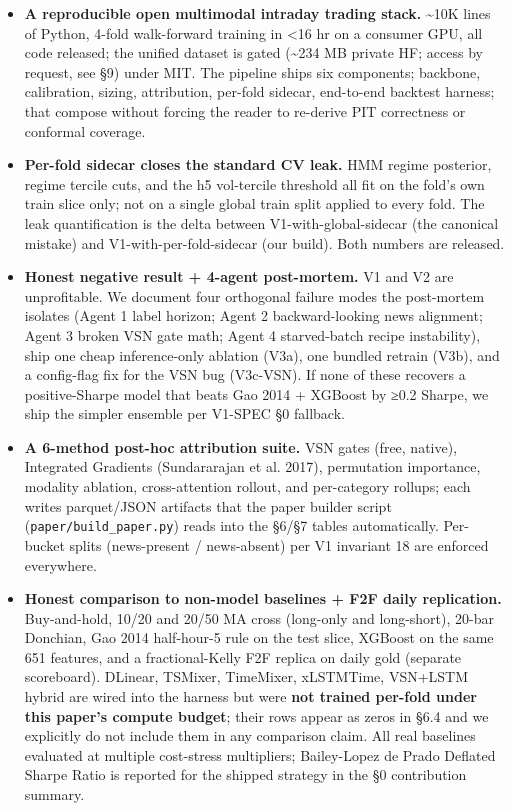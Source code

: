 \documentclass[
]{article}
\newcounter{none} %
\begin{document}
\begin{itemize}
\item
  \textbf{A reproducible open multimodal intraday trading stack.}
  \textasciitilde10K lines of Python, 4-fold walk-forward training in
  \textless16 hr on a consumer GPU, all code released; the unified
  dataset is gated (\textasciitilde234 MB private HF; access by request,
  see §9) under MIT. The pipeline ships six components; backbone,
  calibration, sizing, attribution, per-fold sidecar, end-to-end
  backtest harness; that compose without forcing the reader to re-derive
  PIT correctness or conformal coverage.
\item
  \textbf{Per-fold sidecar closes the standard CV leak.} HMM regime
  posterior, regime tercile cuts, and the h5 vol-tercile threshold all
  fit on the fold's own train slice only; not on a single global train
  split applied to every fold. The leak quantification is the delta
  between V1-with-global-sidecar (the canonical mistake) and
  V1-with-per-fold-sidecar (our build). Both numbers are released.
\item
  \textbf{Honest negative result + 4-agent post-mortem.} V1 and V2 are
  unprofitable. We document four orthogonal failure modes the
  post-mortem isolates (Agent 1 label horizon; Agent 2 backward-looking
  news alignment; Agent 3 broken VSN gate math; Agent 4 starved-batch
  recipe instability), ship one cheap inference-only ablation (V3a), one
  bundled retrain (V3b), and a config-flag fix for the VSN bug
  (V3c-VSN). If none of these recovers a positive-Sharpe model that
  beats Gao 2014 + XGBoost by ≥0.2 Sharpe, we ship the simpler ensemble
  per V1-SPEC §0 fallback.
\item
  \textbf{A 6-method post-hoc attribution suite.} VSN gates (free,
  native), Integrated Gradients (Sundararajan et al. 2017), permutation
  importance, modality ablation, cross-attention rollout, and
  per-category rollups; each writes parquet/JSON artifacts that the
  paper builder script (\texttt{paper/build\_paper.py}) reads into the
  §6/§7 tables automatically. Per-bucket splits (news-present /
  news-absent) per V1 invariant 18 are enforced everywhere.
\item
  \textbf{Honest comparison to non-model baselines + F2F daily
  replication.} Buy-and-hold, 10/20 and 20/50 MA cross (long-only and
  long-short), 20-bar Donchian, Gao 2014 half-hour-5 rule on the test
  slice, XGBoost on the same 651 features, and a fractional-Kelly F2F
  replica on daily gold (separate scoreboard). DLinear, TSMixer,
  TimeMixer, xLSTMTime, VSN+LSTM hybrid are wired into the harness but
  were \textbf{not trained per-fold under this paper's compute budget};
  their rows appear as zeros in §6.4 and we explicitly do not include
  them in any comparison claim. All real baselines evaluated at multiple
  cost-stress multipliers; Bailey-Lopez de Prado Deflated Sharpe Ratio
  is reported for the shipped strategy in the §0 contribution summary.
\end{itemize}
\end{document}
